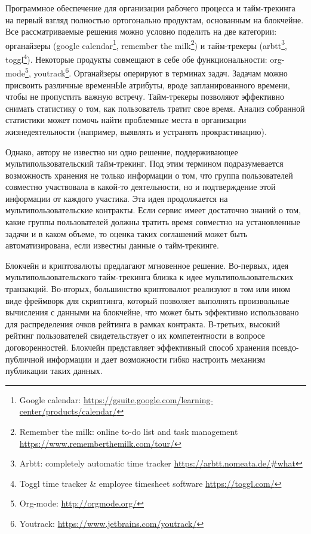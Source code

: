 \documentclass[]{itmo-student-thesis}
\begin{document}
Программное обеспечение для организации рабочего процесса и
тайм-трекинга на первый взгляд полностью ортогонально продуктам,
основанным на блокчейне. Все рассматриваемые решения можно условно
поделить на две категории: органайзеры (google
calendar\footnote{Google calendar:
  \url{https://gsuite.google.com/learning-center/products/calendar/}},
remember the milk\footnote{Remember the milk: online to-do list and
  task management \url{https://www.rememberthemilk.com/tour/}}) и
тайм-трекеры (arbtt\footnote{Arbtt: completely automatic time tracker
  \url{https://arbtt.nomeata.de/#what}}, toggl\footnote{Toggl time
  tracker \& employee timesheet software
  \url{https://toggl.com/}}). Некоторые продукты совмещают в себе обе
функциональности: org-mode\footnote{Org-mode:
  \url{http://orgmode.org/}}, youtrack\footnote{ Youtrack:
  \url{https://www.jetbrains.com/youtrack/}}. Органайзеры оперируют в
терминах задач. Задачам можно присвоить различные временнЫе атрибуты,
вроде запланированного времени, чтобы не пропустить важную
встречу. Тайм-трекеры позволяют эффективно снимать статистику о том,
как пользователь тратит свое время. Анализ собранной статистики может
помочь найти проблемные места в организации жизнедеятельности
(например, выявлять и устранять прокрастинацию).

Однако, автору не известно ни одно решение, поддерживающее
мультипользовательский тайм-трекинг. Под этим термином подразумевается
возможность хранения не только информации о том, что группа
пользователей совместно участвовала в какой-то деятельности, но и
подтверждение этой информации от каждого участика. Эта идея
продолжается на мультипользовательские контракты. Если сервис имеет
достаточно знаний о том, какие группы пользователей должны тратить
время совместно на установленные задачи и в каком объеме, то оценка
таких соглашений может быть автоматизирована, если известны данные о
тайм-трекинге.

Блокчейн и криптовалюты предлагают мгновенное решение. Во-первых, идея
мультипользовательского тайм-трекинга близка к идее
мультипользовательских транзакций. Во-вторых, большинство криптовалют
реализуют в том или ином виде фреймворк для скриптинга, который
позволяет выполнять произвольные вычисления с данными на блокчейне,
что может быть эффективно использовано для распределения очков
рейтинга в рамках контракта. В-третьих, высокий рейтинг пользователей
свидетельствует о их компетентности в вопросе
договоренностей. Блокчейн представляет эффективный способ хранения
псевдо-публичной информации и дает возможности гибко настроить
механизм публикации таких данных.
\end{document}
